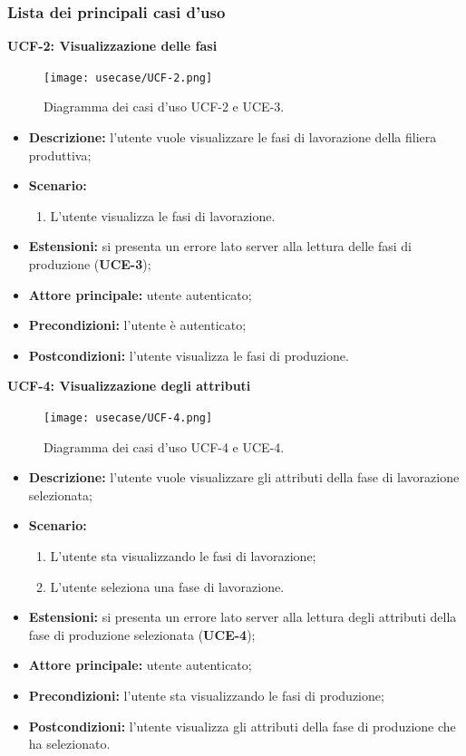 \subsubsection*{Lista dei principali casi d'uso}
    \textbf{UCF-2: Visualizzazione delle fasi}
        \begin{figure}[H]
            \centering
            \texttt{[image: usecase/UCF-2.png]}
            \caption{Diagramma dei casi d'uso UCF-2 e UCE-3.}
        \end{figure}
        \begin{itemize}
            \item \textbf{Descrizione:} l’utente vuole visualizzare le fasi di lavorazione della filiera produttiva;
            \item \textbf{Scenario:}
                \begin{enumerate}
                    \item L’utente visualizza le fasi di lavorazione.
                \end{enumerate}
            \item \textbf{Estensioni:} si presenta un errore lato server alla lettura delle fasi di produzione (\textbf{UCE-3});
            \item \textbf{Attore principale:} utente autenticato;
            \item \textbf{Precondizioni:} l’utente è autenticato;
            \item \textbf{Postcondizioni:} l’utente visualizza le fasi di produzione.
        \end{itemize}

        \textbf{UCF-4: Visualizzazione degli attributi}
        \begin{figure}[H]
            \centering
            \texttt{[image: usecase/UCF-4.png]}
            \caption{Diagramma dei casi d'uso UCF-4 e UCE-4.}
        \end{figure}
        \begin{itemize}
            \item \textbf{Descrizione:} l’utente vuole visualizzare gli attributi della fase di lavorazione selezionata;
            \item \textbf{Scenario:}
                \begin{enumerate}
                    \item L’utente sta visualizzando le fasi di lavorazione;
                    \item L’utente seleziona una fase di lavorazione.
                \end{enumerate}
            \item \textbf{Estensioni:} si presenta un errore lato server alla lettura degli attributi della fase di produzione selezionata (\textbf{UCE-4});
            \item \textbf{Attore principale:} utente autenticato;
            \item \textbf{Precondizioni:} l’utente sta visualizzando le fasi di produzione;
            \item \textbf{Postcondizioni:} l’utente visualizza gli attributi della fase di produzione che ha selezionato.
        \end{itemize}


